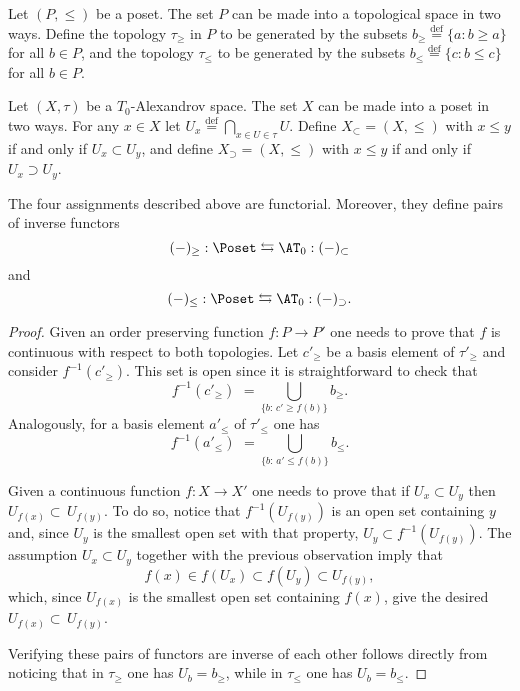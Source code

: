 \documentclass[thesis.tex]{subfiles}
\begin{document}
\begin{definition}
Let $(P,\leq)$ be a poset.
The set $P$ can be made into a topological space in two ways.
Define the topology $\tau_\geq$ in $P$ to be generated by the subsets $b_\geq\stackrel{\mathrm{def}}{=}\{a:b\geq a\}$ for all $b\in P$, and the topology $\tau_\leq$ to be generated by the subsets $b_\leq\stackrel{\mathrm{def}}{=}\{c:b\leq c\}$ for all $b\in P$.\vspace*{6pt}

Let $(X,\tau)$ be a $T_0$-Alexandrov space.
The set $X$ can be made into a poset in two ways.
For any $x\in X$ let $U_x\stackrel{\mathrm{def}}{=}\bigcap_{x\in U\in\tau}U$.
Define $X_\subset=(X,\leq)$ with $x\leq y$ if and only if $U_x\subset U_y$, and define $X_\supset=(X,\leq)$ with $x\leq y$ if and only if $U_x\supset U_y$.
\end{definition}

\begin{lemma}\label{from posets to A spaces and back}
The four assignments described above are functorial.
Moreover, they define pairs of inverse functors
$$(-)_{\geq}:\Poset\leftrightarrows\AT_0:(-)_\subset$$
and
$$(-)_{\leq}:\Poset\leftrightarrows\AT_0:(-)_\supset.$$
\begin{proof}
Given an order preserving function $f:P\to P'$ one needs to prove that $f$ is continuous with respect to both topologies.
Let $c'_\geq$ be a basis element of $\tau'_\geq$ and consider $f^{-1}(c'_\geq)$.
This set is open since it is straightforward to check that
$$f^{-1}(c'_\geq)\,\,=\!\!\!\bigcup_{\{b:\,c'\geq f(b)\!\}}\!\!b_\geq.$$
Analogously, for a basis element $a'_\leq$ of $\tau'_\leq$ one has
$$f^{-1}(a'_\leq)\,\,=\!\!\!\bigcup_{\{b:\,a'\leq f(b)\!\}}\!\!b_\leq.$$

Given a continuous function $f:X\to X'$ one needs to prove that if $U_x\subset U_y$ then $U_{f(x)}\subset\, U_{f(y)}$.
To do so, notice that $f^{-1}(U_{f(y)})$ is an open set containing $y$ and, since $U_y$ is the smallest open set with that property, $U_y\subset f^{-1}(U_{f(y)})$.
The assumption $U_x\subset U_y$ together with the previous observation imply that
$$f(x)\in f(U_x)\subset f(U_y)\subset U_{f(y)},$$
which, since $U_{f(x)}$ is the smallest open set containing $f(x)$, give the desired $U_{f(x)}\subset\, U_{f(y)}$.

Verifying these pairs of functors are inverse of each other follows directly from noticing that in $\tau_\geq$ one has $U_b=b_\geq$, while in $\tau_\leq$ one has $U_b=b_\leq$.
\end{proof}
\end{lemma}
\end{document}
